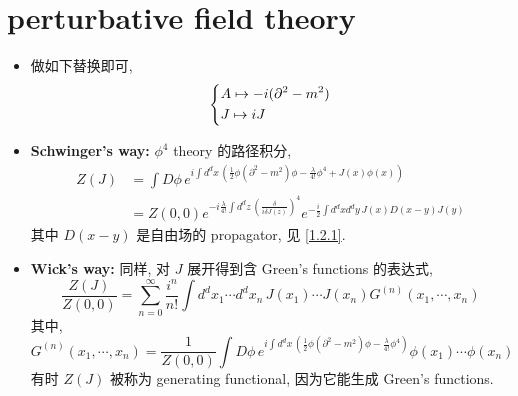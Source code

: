 \section{perturbative field theory}
\begin{itemize}
	\item 做如下替换即可,
	\begin{equation}
		\begin{dcases}
			A \mapsto - i (\partial^2 - m^2) \\
			J \mapsto i J
		\end{dcases}
	\end{equation}
	
	\item \textbf{Schwinger's way:} $\phi^4$ theory 的路径积分,
	\begin{align}
		Z(J) &= \int D\phi \, e^{i \int d^d x \, (\frac{1}{2} \phi (\partial^2 - m^2) \phi - \frac{\lambda}{4!} \phi^4 + J(x) \phi(x))} \\
		&= Z(0, 0) e^{- i \frac{\lambda}{4!} \int d^d z \, (\frac{\delta}{i \delta J(z)})^4} e^{- \frac{i}{2} \int d^d x d^d y \, J(x) D(x - y) J(y)}
	\end{align}
	其中 $D(x - y)$ 是自由场的 propagator, 见 \eqref{1.2.1}.
	
	\item \textbf{Wick's way:} 同样, 对 $J$ 展开得到含 Green's functions 的表达式,
	\begin{equation}
		\frac{Z(J)}{Z(0, 0)} = \sum_{n = 0}^\infty \frac{i^n}{n!} \int d^d x_1 \cdots d^d x_n \, J(x_1) \cdots J(x_n) G^{(n)}(x_1, \cdots, x_n)
	\end{equation}
	其中,
	\begin{equation} \label{3.3.5}
		G^{(n)}(x_1, \cdots, x_n) = \frac{1}{Z(0, 0)} \int D\phi \, e^{i \int d^d x \, (\frac{1}{2} \phi (\partial^2 - m^2) \phi - \frac{\lambda}{4!} \phi^4)} \phi(x_1) \cdots \phi(x_n)
	\end{equation}
	有时 $Z(J)$ 被称为 generating functional, 因为它能生成 Green's functions.
\end{itemize}

